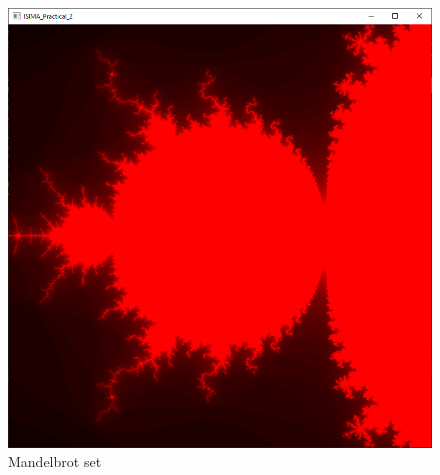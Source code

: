 \documentclass{article}
\begin{document}
\begin{figure}[h]
	\centering
	\includegraphics[scale=0.4]{images/Mandelbrot.png}
	\caption{Mandelbrot set}
\end{figure}
\end{document}
